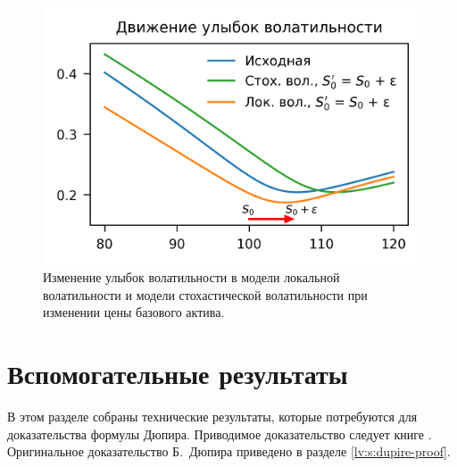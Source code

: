


\begin{figure}[h]
\includegraphics{pic/locvol-iv.png}
\centering
\caption{Изменение улыбок волатильности в модели локальной волатильности и модели стохастической волатильности при изменении цены базового актива.}
\label{lv:f:iv-move}
\end{figure}



\section{Вспомогательные результаты}
В этом разделе собраны технические результаты, которые потребуются для доказательства формулы Дюпира.
Приводимое доказательство следует книге \cite{MusielaRutkowski09}.
Оригинальное доказательство Б.~Дюпира приведено в разделе \ref{lv:s:dupire-proof}.

